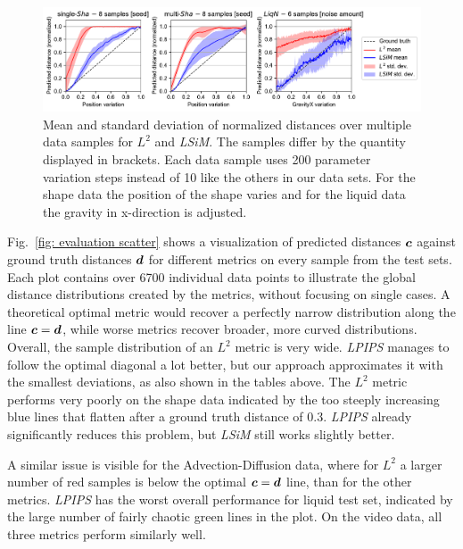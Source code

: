 \begin{figure}[hb]
    \centering
    \includegraphics[width=1.0\textwidth]{Images/ConvergenceCombined}
    \vspace{-0.7cm}
    \caption{Mean and standard deviation of normalized distances over multiple data samples for $L^2$ and \textit{LSiM}. The samples differ by the quantity displayed in brackets. Each data sample uses 200 parameter variation steps instead of 10 like the others in our data sets. For the shape data the position of the shape varies and for the liquid data the gravity in x-direction is adjusted.}
    \label{fig: convergence study}
\end{figure}

Fig.~\ref{fig: evaluation scatter} shows a visualization of predicted distances ${\bm{c}}$ against ground truth distances ${\bm{d}}$ for different metrics on every sample from the test sets. Each plot contains over 6700 individual data points to illustrate the global distance distributions created by the metrics, without focusing on single cases. A theoretical optimal metric would recover a perfectly narrow distribution along the line ${\bm{c}}={\bm{d}}$, while worse metrics recover broader, more curved distributions.
Overall, the sample distribution of an $L^2$ metric is very wide. \textit{LPIPS} manages to follow the optimal diagonal a lot better, but our approach approximates it with the smallest deviations, as also shown in the tables above. The $L^2$ metric performs very poorly on the shape data indicated by the too steeply increasing blue lines that flatten after a ground truth distance of 0.3. \textit{LPIPS} already significantly reduces this problem, but \textit{LSiM} still works slightly better.

A similar issue is visible for the Advection-Diffusion data, where for $L^2$ a larger number of red samples is below the optimal ${\bm{c}}={\bm{d}}$ line, than for the other metrics. \textit{LPIPS} has the worst overall performance for liquid test set, indicated by the large number of fairly chaotic green lines in the plot. On the video data, all three metrics perform similarly well.


